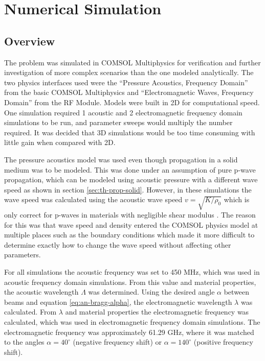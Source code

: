 \documentclass[11pt,twoside]{eitExjobb}
\begin{document}
	
	\chapter{Numerical Simulation}
	
	\section{Overview}
	The problem was simulated in COMSOL Multiphysics for verification and further investigation of more complex scenarios than the one modeled analytically. The two physics interfaces used were the ``Pressure Acoustics, Frequency Domain'' from the basic COMSOL Multiphysics and ``Electromagnetic Waves, Frequency Domain'' from the RF Module. Models were built in 2D for computational speed. One simulation required 1 acoustic and 2 electromagnetic frequency domain simulations to be run, and parameter sweeps would multiply the number required. It was decided that 3D simulations would be too time consuming with little gain when compared with 2D. 
	
	The pressure acoustics model was used even though propagation in a solid medium was to be modeled. This was done under an assumption of pure p-wave propagation, which can be modeled using acoustic pressure with a different wave speed as shown in section \ref{sec:th-prop-solid}. However, in these simulations the wave speed was calculated using the acoustic wave speed $v = \sqrt{K/\rho_0}$ which is only correct for p-waves in materials with negligible shear modulus \cite{Schmerr2016}. The reason for this was that wave speed and density entered the COMSOL physics model at multiple places such as the boundary conditions which made it more difficult to determine exactly how to change the wave speed without affecting other parameters. 
	
	For all simulations the acoustic frequency was set to 450 MHz, which was used in acoustic frequency domain simulations. From this value and material properties, the acoustic wavelength $\Lambda$ was determined. Using the desired angle $\alpha$ between beams and equation \eqref{eq:an-bragg-alpha}, the electromagnetic wavelength $\lambda$ was calculated. From $\lambda$ and material properties the electromagnetic frequency was calculated, which was used in electromagnetic frequency domain simulations. The electromagnetic frequency was approximately 61.29 GHz, where it was matched to the angles $\alpha = 40^\circ$ (negative frequency shift) or $\alpha = 140^\circ$ (positive frequency shift).
	
\end{document}
